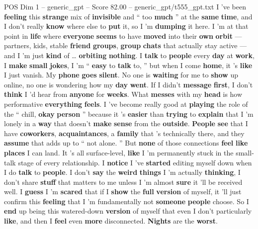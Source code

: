 \begin{textsample}{POS Dim 1 – generic\_gpt – Score 82.00 – generic\_gpt/t555\_gpt.txt}  \label{ex:f1_pos_006}
I ’ve been \textbf{feeling} this \textbf{strange} mix of \textbf{invisible} and “ too \textbf{much} ” at the \textbf{same} \textbf{time}, and I don't really \textbf{know} where else to \textbf{put} it, so I ’m \textbf{dumping} it here.
I ’m at that point in \textbf{life} where \textbf{everyone} \textbf{seems} to have \textbf{moved} into their \textbf{own} \textbf{orbit} — partners, kids, stable \textbf{friend} \textbf{groups}, \textbf{group} \textbf{chats} that actually stay active — and I ’m just \textbf{kind} of … \textbf{orbiting} \textbf{nothing}.
I \textbf{talk} to \textbf{people} every \textbf{day} at \textbf{work}, I \textbf{make} \textbf{small} \textbf{jokes}, I ’m “ \textbf{easy} to \textbf{talk} to, ” but when I come \textbf{home}, it ’s \textbf{like} I just vanish.
My \textbf{phone} \textbf{goes} \textbf{silent}.
No one is \textbf{waiting} for me to \textbf{show} up online, no one is wondering how my \textbf{day} \textbf{went}.
If I didn't \textbf{message} \textbf{first}, I don't \textbf{think} I ’d hear from \textbf{anyone} for \textbf{weeks}.
What \textbf{messes} with my \textbf{head} is how performative \textbf{everything} \textbf{feels}.
I ’ve become really good at \textbf{playing} the role of the “ chill, \textbf{okay} \textbf{person} ” because it ’s \textbf{easier} than \textbf{trying} to \textbf{explain} that I ’m lonely in a \textbf{way} that doesn't \textbf{make} \textbf{sense} from the \textbf{outside}. \textbf{People} \textbf{see} that I have \textbf{coworkers}, \textbf{acquaintances}, a \textbf{family} that ’s technically there, and they \textbf{assume} that adds up to “ not alone. ” But \textbf{none} of those connections \textbf{feel} \textbf{like} \textbf{places} I can land.
It ’s all surface-level, \textbf{like} I ’m permanently stuck in the small-talk stage of every relationship.
I \textbf{notice} I ’ve \textbf{started} editing myself down when I do \textbf{talk} to \textbf{people}.
I don't \textbf{say} the \textbf{weird} \textbf{things} I ’m actually \textbf{thinking}, I don't share \textbf{stuff} that matters to me unless I ’m almost \textbf{sure} it ’ll be received well.
I \textbf{guess} I ’m \textbf{scared} that if I \textbf{show} the \textbf{full} \textbf{version} of myself, it ’ll just confirm this \textbf{feeling} that I ’m fundamentally not \textbf{someone} \textbf{people} choose.
So I \textbf{end} up being this watered-down \textbf{version} of myself that even I don't particularly \textbf{like}, and then I \textbf{feel} even \textbf{more} disconnected. \textbf{Nights} are the \textbf{worst}.

\end{textsample}
